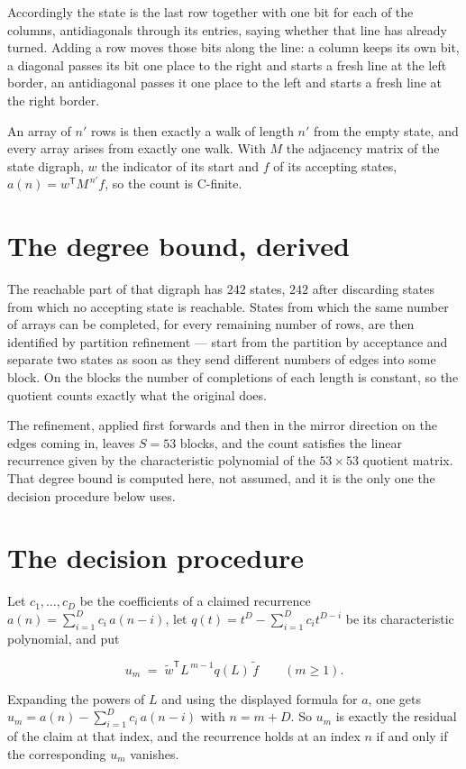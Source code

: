 \documentclass[11pt]{article}
\theoremstyle{definition}
\begin{document}
Accordingly the state is the last row together with one bit for each of the columns, antidiagonals through its entries, saying whether that line has already turned. Adding a row moves those bits along the line: a column keeps its own bit, a diagonal passes its bit one place to the right and starts a fresh line at the left border, an antidiagonal passes it one place to the left and starts a fresh line at the right border.

An array of $n'$ rows is then exactly a walk of length $n'$ from the empty state, and every array arises from exactly one walk. With $M$ the adjacency matrix of the state digraph, $w$ the indicator of its start and $f$ of its accepting states, $a(n) = w^{\mathsf T}M^{\,n'}f$, so the count is C-finite.

\section{The degree bound, derived}

The reachable part of that digraph has $242$ states, $242$ after discarding states from which no accepting state is reachable. States from which the same number of arrays can be completed, for every remaining number of rows, are then identified by partition refinement --- start from the partition by acceptance and separate two states as soon as they send different numbers of edges into some block. On the blocks the number of completions of each length is constant, so the quotient counts exactly what the original does.

The refinement, applied first forwards and then in the mirror direction on the edges coming in, leaves $S = 53$ blocks, and the count satisfies the linear recurrence given by the characteristic polynomial of the $53 \times 53$ quotient matrix. That degree bound is computed here, not assumed, and it is the only one the decision procedure below uses.

\section{The decision procedure}

Let $c_1,\dots,c_D$ be the coefficients of a claimed recurrence $a(n) = \sum_{i=1}^{D} c_i\,a(n-i)$, let $q(t) = t^{D} - \sum_{i=1}^{D} c_i t^{D-i}$ be its characteristic polynomial, and put

\[u_m \;=\; \tilde w^{\mathsf T} L^{\,m-1} q(L)\,\tilde f \qquad (m \ge 1).\]

Expanding the powers of $L$ and using the displayed formula for $a$, one gets $u_m = a(n) - \sum_{i=1}^{D} c_i\,a(n-i)$ with $n = m + D$. So $u_m$ is exactly the residual of the claim at that index, and the recurrence holds at an index $n$ if and only if the corresponding $u_m$ vanishes.
\end{document}
